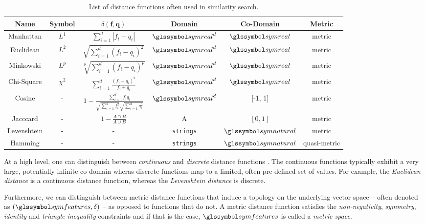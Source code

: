 \begin{table}[hb]
    \begin{tabular}{ | c | c | c | c | c | c |}
        \hline
        \textbf{Name} & \textbf{Symbol} &  $\delta \mathbf{(f,q)}$ & \textbf{Domain} & \textbf{Co-Domain} & \textbf{Metric} \\
        \hline
        \hline 
        Manhattan & $L^1$ & $\sum_{i=1}^{d} | f_i - q_i |$ & $\symreal^d$ & $\symreal$ & metric \\ 
        \hline
        Euclidean & $L^2$ & $\sqrt{\sum_{i=1}^{d} (f_i - q_i)^2}$ & $\symreal^d$ & $\symreal$ & metric \\  
        \hline
        Minkowski & $L^p$ & $\sqrt[p]{\sum_{i=1}^{d} (f_i - q_i)^p}$ & $\symreal^d$ & $\symreal$ & metric \\ 
        \hline
        Chi-Square & $\chi^2$ & $\sum_{i=1}^{d} \frac{(f_i - q_i)^2}{f_i + q_i}$ & $\symreal^d$ & $\symreal$ & metric \\ 
        \hline
        Cosine & - & $1 - \frac{\sum_{i=1}^{d} f_{i}q_{i}}{\sqrt{\sum_{i=1}^{d} f_i^2} \sqrt{\sum_{i=1}^{d} q_i^2}}$ & $\symreal^d$ & [-1, 1] & metric \\  
        \hline
        Jacccard & - & $1 - \frac{A \cap B}{A \cup B}$ & A & $[0, 1]$ & metric \\
        \hline
        Levenshtein & - & - & \texttt{strings} & $\symnatural$ & metric \\
        \hline
        Hamming & - & - &  \texttt{strings} & $\symnatural$ & quasi-metric \\
        \hline
    \end{tabular}
    \caption{List of distance functions often used in similarity search.}
    \label{table:similarity_measures}
\end{table}

At a high level, one can distinguish between \emph{continuous} and \emph{discrete} distance functions \cite{Zezula:2006Similarity}. The continuous functions typically exhibit a very large, potentially infinite co-domain wheras discrete functions map to a limited, often pre-defined set of values. For example, the \emph{Euclidean distance} is a continuous distance function, whereas the \emph{Levenshtein distance} is discrete.

Furthermore, we can distinguish between metric distance functions that induce a topology on the underlying vector space -- often denoted as $(\symfeatures, \delta)$ -- as opposed to functions that do not. A metric distance function satisfies the \emph{non-negativity}, \emph{symmetry}, \emph{identity} and \emph{triangle inequality} constraints and if that is the case, $\symfeatures$ is called a \emph{metric space}. 

